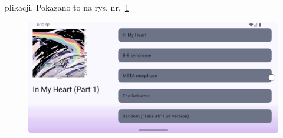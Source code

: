 plikacji. Pokazano to na rys. nr.~\ref{fig:tutorial_rotate}

\begin{figure}[H]
	\centering
	\includegraphics[width=1\textwidth]{images/tutorial_rotate.png}
	\caption{}
	\label{fig:tutorial_rotate}
\end{figure}
